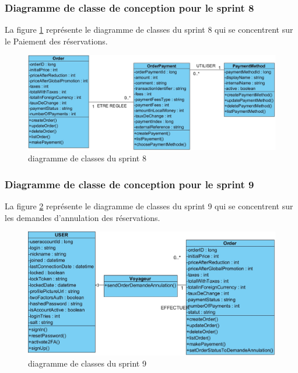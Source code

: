 \documentclass[12pt]{report}
\begin{document}
			\subsubsection{Diagramme de classe de conception pour le sprint 8}
				
			\hspace{15pt} La figure \ref{fig:sprint8} représente le diagramme de classes du sprint 8 qui se concentrent sur le Paiement des réservations.


			\begin{figure}[h]
				\centering
				\includegraphics[width=\textwidth]{sprint8.jpg}
				\caption{diagramme de classes du sprint 8}
				\label{fig:sprint8}
			\end{figure}
			\FloatBarrier


			\subsubsection{Diagramme de classe de conception pour le sprint 9}
				
			\hspace{15pt} La figure \ref{fig:sprint9} représente le diagramme de classes du sprint 9 qui se concentrent sur les demandes d’annulation des réservations.


			\begin{figure}[h]
				\centering
				\includegraphics[width=\textwidth]{sprint9.jpg}
				\caption{diagramme de classes du sprint 9}
				\label{fig:sprint9}
			\end{figure}
			\FloatBarrier
\end{document}
